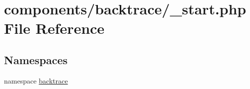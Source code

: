 \hypertarget{components_2backtrace_2__start_8php}{
\section{components/backtrace/\_\-start.php File Reference}
\label{components_2backtrace_2__start_8php}
}
\subsection*{Namespaces}
\begin{CompactItemize}
\item 
namespace \hyperlink{namespacebacktrace}{backtrace}
\end{CompactItemize}

